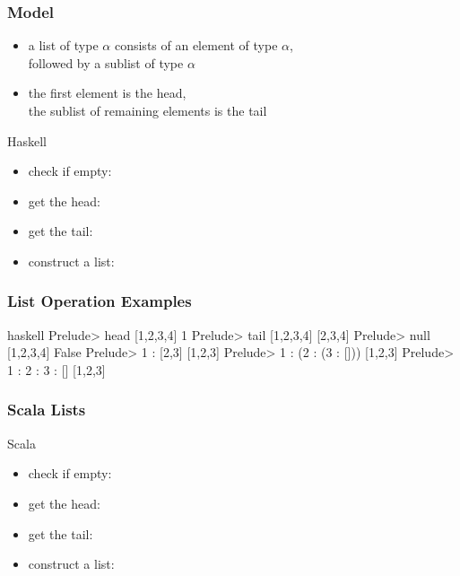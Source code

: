 \documentclass[dvipsnames]{beamer}
\theoremstyle{plain}
\begin{document}
\begin{frame}
  \frametitle{Model}

  \begin{itemize}
    \item a list of type \texttt{$\alpha$}
      consists of an element of type \texttt{$\alpha$},\\
      followed by a sublist of type \texttt{$\alpha$}
    \item the first element is the \alert{head},\\
      the sublist of remaining elements is the \alert{tail}
  \end{itemize}

  \pause
  \medskip
  \begin{block}{Haskell}
    \begin{itemize}
      \item check if empty: 
      \item get the head: 
      \item get the tail: 
      \item construct a list: 
    \end{itemize}
  \end{block}
\end{frame}

\begin{frame}[fragile]
  \frametitle{List Operation Examples}

  \begin{example}[Haskell]
    \begin{pygments}{haskell}
Prelude> head [1,2,3,4]
1
Prelude> tail [1,2,3,4]
[2,3,4]
Prelude> null [1,2,3,4]
False
Prelude> 1 : [2,3]
[1,2,3]
Prelude> 1 : (2 : (3 : []))
[1,2,3]
Prelude> 1 : 2 : 3 : []
[1,2,3]
    \end{pygments}
  \end{example}
\end{frame}

\begin{frame}
  \frametitle{Scala Lists}

  \begin{block}{Scala}
    \begin{itemize}
      \item check if empty: 
      \item get the head: 
      \item get the tail: 
      \item construct a list: 
    \end{itemize}
  \end{block}
\end{frame}
\end{document}
